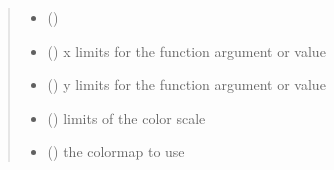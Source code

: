 \documentclass[letterpaper,10pt,english,openany,oneside]{sphinxmanual}
\begin{document}
\begin{fulllineitems}
\begin{fulllineitems}
\begin{quote}
\begin{description}
\begin{itemize}
\item {} 
 () \textendash{} 

\item {} 
 (\sphinxstyleliteralemphasis{\sphinxupquote{{[}}}\sphinxstyleliteralemphasis{\sphinxupquote{{]} }}\sphinxstyleliteralemphasis{\sphinxupquote{, }}\sphinxstyleliteralemphasis{\sphinxupquote{, }}) \textendash{} x limits for the function argument or value

\item {} 
 (\sphinxstyleliteralemphasis{\sphinxupquote{{[}}}\sphinxstyleliteralemphasis{\sphinxupquote{{]} }}\sphinxstyleliteralemphasis{\sphinxupquote{, }}\sphinxstyleliteralemphasis{\sphinxupquote{, }}) \textendash{} y limits for the function argument or value

\item {} 
 (\sphinxstyleliteralemphasis{\sphinxupquote{{[}}}\sphinxstyleliteralemphasis{\sphinxupquote{{]} }}\sphinxstyleliteralemphasis{\sphinxupquote{, }}\sphinxstyleliteralemphasis{\sphinxupquote{, }}\sphinxstyleliteralemphasis{\sphinxupquote{(}}\sphinxstyleliteralemphasis{\sphinxupquote{,}}\sphinxstyleliteralemphasis{\sphinxupquote{)}}) \textendash{} limits of the color scale

\item {} 
 (\sphinxstyleliteralemphasis{\sphinxupquote{, }}\sphinxstyleliteralemphasis{\sphinxupquote{, }}) \textendash{} the colormap to use


\end{itemize}
\end{description}
\end{quote}
\end{fulllineitems}
\end{fulllineitems}
\end{document}
